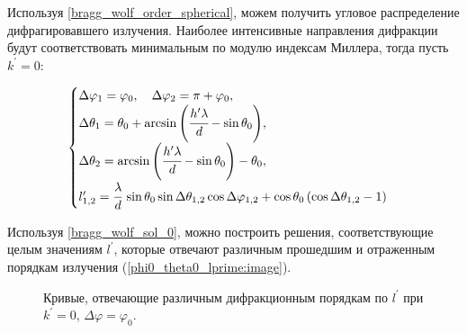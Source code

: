 
Используя \autoref{bragg_wolf_order_spherical}, можем получить угловое распределение дифрагировавшего излучения. Наиболее интенсивные направления дифракции будут соответствовать минимальным по модулю индексам Миллера, тогда пусть $k^\prime = 0$:

    \begin{equation}
        \begin{cases}
            \Delta \varphi_1 = \varphi_0, \quad \Delta \varphi_2 = \pi + \varphi_0,
            \\
            \Delta \theta_1 = \theta_0 + \arcsin{\left( \cfrac{h^{\prime} \lambda}{d} - \sin{\theta_0} \right)},
            \\
            \Delta \theta_2 = \arcsin{\left( \cfrac{h^{\prime} \lambda}{d} - \sin{\theta_0} \right)} - \theta_0,
            \\
            l^{\prime}_{1,2} = \cfrac{\lambda}{d}\:\sin{\theta_0}\sin{\Delta \theta_{1,2}}\cos{\Delta \varphi_{1,2}} + \cos{\theta_0} \left( \cos{\Delta \theta_{1,2}} - 1 \right)
        \end{cases}
        \label{bragg_wolf_sol_0}
    \end{equation}

Используя \autoref{bragg_wolf_sol_0}, можно построить решения, соответствующие целым значениям $l^\prime$, которые отвечают различным прошедшим и отраженным порядкам излучения (\autoref{phi0_theta0_lprime:image}).

    \begin{figure}[ht]
        \hfil
        \caption{Кривые, отвечающие различным дифракционным порядкам по $l^\prime$ при $k^\prime = 0$, $\Delta \varphi = \varphi_0$.}\label{phi0_theta0_lprime:image}
    \end{figure}

